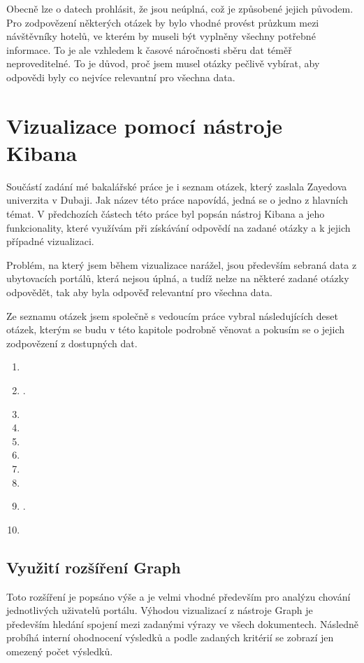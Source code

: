 \documentclass[czech,BP]{thesiskiv}
\begin{document}
Obecně lze o datech prohlásit, že jsou neúplná, což je způsobené jejich původem. Pro zodpovězení některých otázek by bylo vhodné provést průzkum mezi návštěvníky hotelů, ve kterém by museli být vyplněny všechny potřebné informace. To je ale vzhledem k časové náročnosti sběru dat téměř neproveditelné. To je důvod, proč jsem musel otázky pečlivě vybírat, aby odpovědi byly co nejvíce relevantní pro všechna data.

\chapter{Vizualizace pomocí nástroje Kibana}
\label{Vizualizace}
Součástí zadání mé bakalářské práce je i seznam otázek, který zaslala Zayedova univerzita v Dubaji. Jak název této práce napovídá, jedná se o jedno z hlavních témat. V předchozích částech této práce byl popsán nástroj Kibana a jeho funkcionality, které využívám při získávání odpovědí na zadané otázky a k jejich případné vizualizaci.


Problém, na který jsem během vizualizace narážel, jsou především sebraná data z ubytovacích portálů, která nejsou úplná, a tudíž nelze na některé zadané otázky odpovědět, tak aby byla odpověď relevantní pro všechna data.


Ze seznamu otázek jsem společně s vedoucím práce vybral následujících deset otázek, kterým se budu v této kapitole podrobně věnovat a pokusím se o jejich zodpovězení z dostupných dat.
\begin{enumerate}
	\item {}
	\item {}.
	\item {}
	\item {}
	\item {}
	\item {}
	\item {}
	\item {}
	\item {}.
	\item {}
\end{enumerate}


\section{Využití rozšíření Graph}
Toto rozšíření je popsáno výše a je velmi vhodné především pro analýzu chování jednotlivých uživatelů portálu. Výhodou vizualizací z nástroje Graph je především hledání spojení mezi zadanými výrazy ve všech dokumentech. Následně probíhá interní ohodnocení výsledků a podle zadaných kritérií se zobrazí jen omezený počet výsledků.
\end{document}
